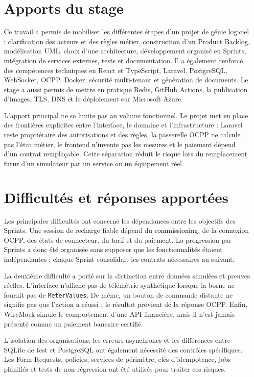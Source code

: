 \section*{Apports du stage}

Ce travail a permis de mobiliser les différentes étapes d'un projet de génie
logiciel : clarification des acteurs et des règles métier, construction d'un
Product Backlog, modélisation UML, choix d'une architecture, développement
organisé en Sprints, intégration de services externes, tests et documentation. Il a
également renforcé des compétences techniques en React et TypeScript, Laravel,
PostgreSQL, WebSocket, OCPP, Docker, sécurité multi-tenant et génération de
documents. Le stage a aussi permis de mettre en pratique Redis, GitHub Actions,
la publication d'images, TLS, DNS et le déploiement sur Microsoft Azure.

L'apport principal ne se limite pas au volume fonctionnel. Le projet met en place
des frontières explicites entre l'interface, le domaine et l'infrastructure :
Laravel reste propriétaire des autorisations et des règles, la passerelle OCPP
ne calcule pas l'état métier, le frontend n'invente pas les mesures et le
paiement dépend d'un contrat remplaçable. Cette séparation réduit le risque lors
du remplacement futur d'un simulateur par un service ou un équipement réel.

\section*{Difficultés et réponses apportées}

Les principales difficultés ont concerné les dépendances entre les objectifs des Sprints.
Une session de recharge fiable dépend du commissioning, de la connexion OCPP,
des états de connecteur, du tarif et du paiement. La progression par Sprints a donc
été organisée sans supposer que les fonctionnalités étaient indépendantes :
chaque Sprint consolidait les contrats nécessaires au suivant.

La deuxième difficulté a porté sur la distinction entre données simulées et
preuves réelles. L'interface n'affiche pas de télémétrie synthétique lorsque la
borne ne fournit pas de \texttt{MeterValues}. De même, un bouton de commande
distante ne signifie pas que l'action a réussi ; le résultat provient de la
réponse OCPP. Enfin, WireMock simule le comportement d'une API financière, mais
il n'est jamais présenté comme un paiement bancaire certifié.

L'isolation des organisations, les erreurs asynchrones et les différences entre
SQLite de test et PostgreSQL ont également nécessité des contrôles spécifiques.
Les Form Requests, policies, services de périmètre, clés d'idempotence, jobs
planifiés et tests de non-régression ont été utilisés pour traiter ces risques.

